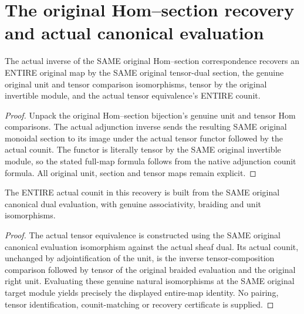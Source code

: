 \section{The original Hom--section recovery and actual canonical evaluation}

\begin{lemma}\label{sc0-hom-section-recovery:counit}
\leanok
{}
The actual inverse of the SAME original Hom--section correspondence recovers an ENTIRE original map by the SAME original tensor-dual section, the genuine original unit and tensor comparison isomorphisms, tensor by the original invertible module, and the actual tensor equivalence's ENTIRE counit.
\end{lemma}
\begin{proof}
Unpack the original Hom--section bijection's genuine unit and tensor Hom comparisons. The actual adjunction inverse sends the resulting SAME original monoidal section to its image under the actual tensor functor followed by the actual counit. The functor is literally tensor by the SAME original invertible module, so the stated full-map formula follows from the native adjunction counit formula. All original unit, section and tensor maps remain explicit.
\end{proof}

\begin{lemma}\label{sc0-hom-section-recovery:evaluation}
\leanok
{}
The ENTIRE actual counit in this recovery is built from the SAME original canonical dual evaluation, with genuine associativity, braiding and unit isomorphisms.
\end{lemma}
\begin{proof}
The actual tensor equivalence is constructed using the SAME original canonical evaluation isomorphism against the actual sheaf dual. Its actual counit, unchanged by adjointification of the unit, is the inverse tensor-composition comparison followed by tensor of the original braided evaluation and the original right unit. Evaluating these genuine natural isomorphisms at the SAME original target module yields precisely the displayed entire-map identity. No pairing, tensor identification, counit-matching or recovery certificate is supplied.
\end{proof}
